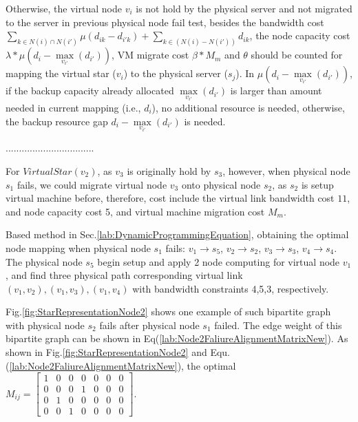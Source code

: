 Otherwise, the virtual node $v_i$ is not hold by the physical server and not migrated to the server in previous physical node fail test, besides the bandwidth cost ${\sum\limits_{k \in N(i) \cap N(i')} {\mu({d_{ik}} - {d_{i'k}})}  + \sum\limits_{k \in \left( {N(i) - N(i')} \right)} {{d_{ik}}} }$, the node capacity cost ${\lambda * \mu({d_i} - \mathop {\max }\limits_{{v_{i'}}} \left( {{d_{i'}}} \right))}$, VM migrate cost ${\beta * {M_m}}$ and $\theta$ should be counted for mapping the virtual star ($v_i$) to the physical server ($s_j$). In ${\mu({d_i} - \mathop {\max }\limits_{{v_{i'}}} \left( {{d_{i'}}} \right))}$, if the backup capacity already allocated ${\mathop {\max }\limits_{{v_{i'}}} \left( {{d_{i'}}} \right)}$ is larger than amount needed  in current mapping (i.e., $d_i$), no additional resource is needed, otherwise, the backup resource gap ${{d_i} - \mathop {\max }\limits_{{v_{i'}}} \left( {{d_{i'}}} \right)}$ is needed.

.................................


For $VirtualStar(v_2)$, as $v_3$ is originally hold by $s_3$, however, when physical node $s_1$ fails, we could migrate virtual node $v_3$ onto physical node $s_2$, as $s_2$ is setup virtual machine before, therefore, cost include the virtual link bandwidth cost $11$, and node capacity cost 5, and virtual machine migration cost $M_m$.

Based method in Sec.\ref{lab:DynamicProgrammingEquation}, obtaining the optimal node mapping when physical node $s_1$ fails: $v_1 \rightarrow s_5$, $v_2 \rightarrow s_2$, $v_3 \rightarrow s_3$, $v_4 \rightarrow s_4$. The physical node $s_5$ begin setup and apply 2 node computing for virtual node $v_1$, and find three physical path corresponding virtual link $(v_1,v_2),(v_1,v_3),(v_1,v_4)$ with bandwidth constraints 4,5,3, respectively.

Fig.\ref{fig:StarRepresentationNode2} shows one example of such  bipartite graph with physical node $s_2$ fails after physical node $s_1$ failed. The edge weight of this   bipartite graph can be shown in  Eq(\ref{lab:Node2FaliureAlignmentMatrixNew}).
As shown in Fig.\ref{fig:StarRepresentationNode2} and Equ.(\ref{lab:Node2FaliureAlignmentMatrixNew}), the optimal $M_{ij}=\left[ {\begin{array}{*{20}{c}}
1&0&0&0&0&0&0\\
0&0&0&1&0&0&0\\
0&1&0&0&0&0&0\\
0&0&1&0&0&0&0
\end{array}} \right]$.


